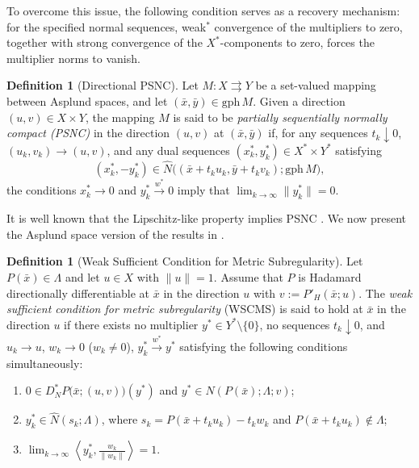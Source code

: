 \documentclass[12pt,twoside,reqno]{amsart}
\theoremstyle{definition}
\newtheorem{definition}[theorem]{Definition}
\numberwithin{equation}{section}
\begin{document}
To overcome this issue, the following condition serves as a recovery mechanism: for the specified normal sequences, weak\(^*\) convergence of the multipliers to zero, together with strong convergence of the \(X^*\)-components to zero, forces the multiplier norms to vanish.

\begin{definition}[Directional PSNC] \label{def:directionally_psnc}
Let $M: X \rightrightarrows Y$ be a set-valued mapping between Asplund spaces, and let $(\bar{x}, \bar{y}) \in \mathrm{gph}\, M$. Given a direction $(u, v) \in X \times Y$, the mapping $M$ is said to be \emph{partially sequentially normally compact (PSNC)} in the direction $(u, v)$ at $(\bar{x}, \bar{y})$ if, for any sequences $t_k \downarrow 0$, $(u_k, v_k) \to (u, v)$, and any dual sequences $(x_k^*, y_k^*) \in X^* \times Y^*$ satisfying 
\begin{equation*}
    (x_k^*, -y_k^*) \in \widehat{N} \big( (\bar{x} + t_k u_k, \bar{y} + t_k v_k); \mathrm{gph}\, M \big),
\end{equation*}
the conditions $x_k^* \to 0$ and $y_k^* \xrightarrow{w^*} 0$ imply that $\lim_{k \to \infty} \|y_k^*\| = 0$. 
\end{definition}

It is well known that the Lipschitz-like property implies PSNC \cite[Theorem~1.44]{Mordukhovich2006variational}. We now present the Asplund space version of the results in \cite[Theorem~3.1]{bai2019directional}. 

\begin{definition}[Weak Sufficient Condition for Metric Subregularity] \label{defn:wscms}
    Let $P(\bar{x}) \in \Lambda$ and let $u \in X$ with $\|u\|=1$. Assume that $P$ is Hadamard directionally differentiable at $\bar{x}$ in the direction $u$ with $v := P'_H(\bar{x}; u)$. The \emph{weak sufficient condition for metric subregularity} (WSCMS) is said to hold at $\bar{x}$ in the direction $u$ if there exists no multiplier $y^* \in Y^* \setminus \{0\}$, no sequences $t_k \downarrow 0$, and $u_k \to u$, $w_k \to 0$ ($w_k \neq 0$), $y_k^* \xrightarrow{w^*} y^*$ satisfying the following conditions simultaneously:
    \begin{enumerate}
        \item[\rm(1)] $0 \in D_N^* P\big(\bar{x}; (u,v)\big)(y^*)$ and $y^* \in N(P(\bar{x}); \Lambda; v)$;
        \item[\rm(2)] $y_k^* \in \widehat{N}(s_k; \Lambda)$, where $s_k = P(\bar{x} + t_k u_k) - t_k w_k$ and $P(\bar{x} + t_k u_k) \notin \Lambda$;
        \item[\rm(3)] $\lim_{k \to \infty} \left\langle y_k^*, \frac{w_k}{\|w_k\|} \right\rangle = 1$.
    \end{enumerate}
\end{definition}
\end{document}
